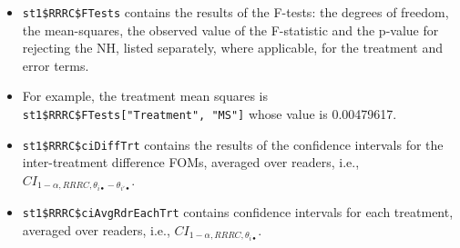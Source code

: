 \documentclass[
]{book}
\newenvironment{Shaded}{\begin{snugshade}}{\end{snugshade}}
\newcommand{\CommentTok}[1]{\textcolor[rgb]{0.56,0.35,0.01}{\textit{#1}}}
\newcommand{\DataTypeTok}[1]{\textcolor[rgb]{0.13,0.29,0.53}{#1}}
\newcommand{\DecValTok}[1]{\textcolor[rgb]{0.00,0.00,0.81}{#1}}
\newcommand{\KeywordTok}[1]{\textcolor[rgb]{0.13,0.29,0.53}{\textbf{#1}}}
\newcommand{\NormalTok}[1]{#1}
\newcommand{\OperatorTok}[1]{\textcolor[rgb]{0.81,0.36,0.00}{\textbf{#1}}}
\providecommand{\tightlist}{%
  \setlength{\itemsep}{0pt}\setlength{\parskip}{0pt}}
\begin{document}
\begin{itemize}
\tightlist
\item
  \texttt{st1\$RRRC\$FTests} contains the results of the F-tests: the degrees of freedom, the mean-squares, the observed value of the F-statistic and the p-value for rejecting the NH, listed separately, where applicable, for the treatment and error terms.
\item
  For example, the treatment mean squares is \texttt{st1\$RRRC\$FTests{[}"Treatment",\ "MS"{]}} whose value is 0.00479617.
\end{itemize}

\begin{Shaded}
\end{Shaded}

\begin{itemize}
\tightlist
\item
  \texttt{st1\$RRRC\$ciDiffTrt} contains the results of the confidence intervals for the inter-treatment difference FOMs, averaged over readers, i.e., \(CI_{1-\alpha,RRRC,\theta_{i \bullet} - \theta_{i' \bullet}}\).
\end{itemize}

\begin{Shaded}
\end{Shaded}

\begin{itemize}
\tightlist
\item
  \texttt{st1\$RRRC\$ciAvgRdrEachTrt} contains confidence intervals for each treatment, averaged over readers, i.e., \(CI_{1-\alpha,RRRC,\theta_{i \bullet}}\).
\end{itemize}
\end{document}

